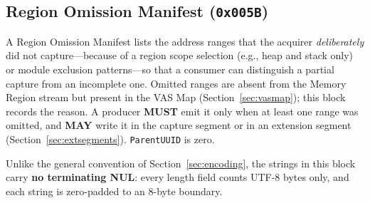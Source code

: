 \documentclass[11pt,a4paper]{article}
\newcommand{\MUST}{\textbf{MUST}}
\newcommand{\MAY}{\textbf{MAY}}
\newcommand{\hex}[1]{\texttt{0x#1}}
\newcommand{\field}[1]{\texttt{#1}}
\begin{document}
\subsection{Region Omission Manifest (\hex{005B})}\label{sec:omission}
A Region Omission Manifest lists the address ranges that the acquirer \emph{deliberately} did not capture---because of a region scope selection (e.g., heap and stack only) or module exclusion patterns---so that a consumer can distinguish a partial capture from an incomplete one. Omitted ranges are absent from the Memory Region stream but present in the VAS Map (Section~\ref{sec:vasmap}); this block records the reason. A producer \MUST{} emit it only when at least one range was omitted, and \MAY{} write it in the capture segment or in an extension segment (Section~\ref{sec:extsegments}). \field{ParentUUID} is zero.

Unlike the general convention of Section~\ref{sec:encoding}, the strings in this block carry \textbf{no terminating NUL}: every length field counts UTF-8 bytes only, and each string is zero-padded to an 8-byte boundary.
\end{document}
